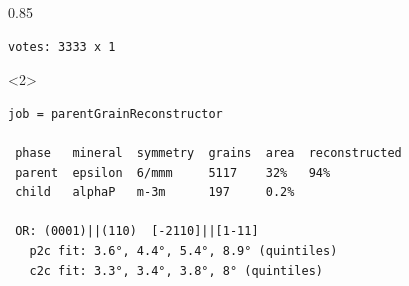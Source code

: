 \documentclass[compress,aspectratio=1610,fleqn,10pt]{beamer}
\begin{document}
\begin{frame}[fragile]
\begin{overlayarea}{\textwidth}{0.85\textheight}
\begin{onlyenv}
\begin{lstlisting}[style=output]
 votes: 3333 x 1
\end{lstlisting}
    \end{onlyenv}
    \begin{onlyenv}<2>
      \vspace{-0.3cm}
\begin{lstlisting}[style=output]
job = parentGrainReconstructor

 phase   mineral  symmetry  grains  area  reconstructed
 parent  epsilon  6/mmm     5117    32%   94%
 child   alphaP   m-3m      197     0.2%

 OR: (0001)||(110)  [-2110]||[1-11]
   p2c fit: 3.6°, 4.4°, 5.4°, 8.9° (quintiles)
   c2c fit: 3.3°, 3.4°, 3.8°, 8° (quintiles)
\end{lstlisting}
    \end{onlyenv}
  \end{overlayarea}

\end{frame}
\end{document}
